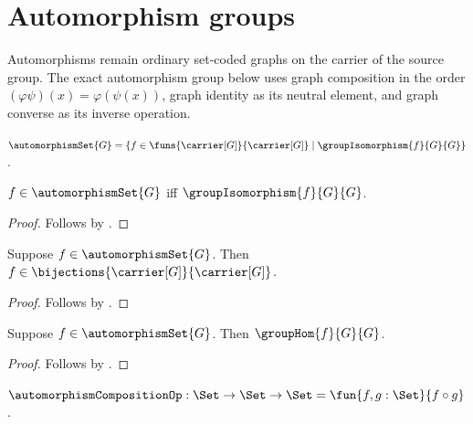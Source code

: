 


\section{Automorphism groups}

Automorphisms remain ordinary set-coded graphs on the carrier of the source
group.  The exact automorphism group below uses graph composition in the order
$(\varphi\psi)(x)=\varphi(\psi(x))$, graph identity as its neutral element,
and graph converse as its inverse operation.

\begin{definition}\label{automorphism_set}
    $\automorphismSet{G}=
        \{f\in\funs{\carrier[G]}{\carrier[G]}
            \mid \groupIsomorphism{f}{G}{G}\}$.
\end{definition}

\begin{proposition}\label{automorphism_set_iff}
    $f\in\automorphismSet{G}$ iff
        $\groupIsomorphism{f}{G}{G}$.
\end{proposition}
\begin{proof}
    Follows by
        .
\end{proof}

\begin{corollary}\label{automorphism_set_type}
    Suppose $f\in\automorphismSet{G}$.
    Then $f\in\bijections{\carrier[G]}{\carrier[G]}$.
\end{corollary}
\begin{proof}
    Follows by
        .
\end{proof}

\begin{corollary}\label{automorphism_set_is_hom}
    Suppose $f\in\automorphismSet{G}$.
    Then $\groupHom{f}{G}{G}$.
\end{corollary}
\begin{proof}
    Follows by
        .
\end{proof}

\begin{definition}\label{automorphism_composition_op}
    $\automorphismCompositionOp:\Set\to\Set\to\Set
        =\fun{f,g:\Set}{f\circ g}$.
\end{definition}

